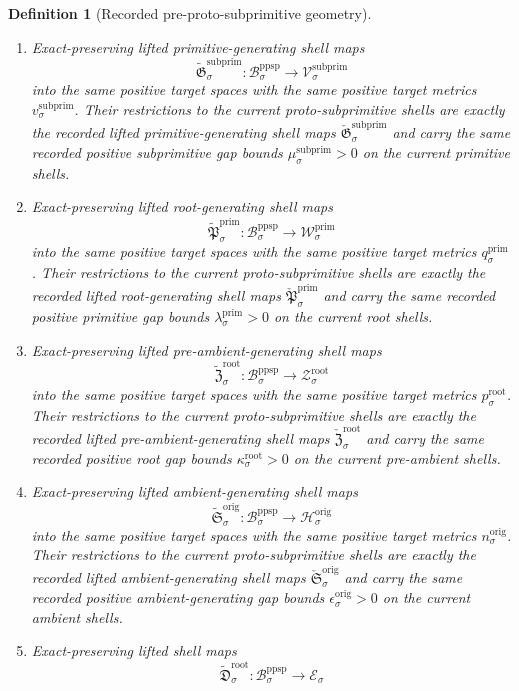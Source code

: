 \documentclass[11pt]{article}
\newcommand{\ShellTarget}[1]{\mathcal E_{#1}}
\newcommand{\OriginTarget}[1]{\mathcal H_{#1}^{\mathrm{orig}}}
\newcommand{\OriginTargetMetric}[1]{n_{#1}^{\mathrm{orig}}}
\newcommand{\OriginGap}[1]{\epsilon_{#1}^{\mathrm{orig}}}
\newcommand{\RootTarget}[1]{\mathcal Z_{#1}^{\mathrm{root}}}
\newcommand{\RootTargetMetric}[1]{p_{#1}^{\mathrm{root}}}
\newcommand{\RootGap}[1]{\kappa_{#1}^{\mathrm{root}}}
\newcommand{\PrimTarget}[1]{\mathcal W_{#1}^{\mathrm{prim}}}
\newcommand{\PrimTargetMetric}[1]{q_{#1}^{\mathrm{prim}}}
\newcommand{\PrimGap}[1]{\lambda_{#1}^{\mathrm{prim}}}
\newcommand{\SubprimTarget}[1]{\mathcal V_{#1}^{\mathrm{subprim}}}
\newcommand{\SubprimTargetMetric}[1]{v_{#1}^{\mathrm{subprim}}}
\newcommand{\SubprimGap}[1]{\mu_{#1}^{\mathrm{subprim}}}
\newcommand{\ProtoSubprimLiftedPrimitive}[1]{\check{\mathfrak G}_{#1}^{\mathrm{subprim}}}
\newcommand{\ProtoSubprimLiftedRoot}[1]{\check{\mathfrak P}_{#1}^{\mathrm{prim}}}
\newcommand{\ProtoSubprimLiftedPreAmbient}[1]{\check{\mathfrak Z}_{#1}^{\mathrm{root}}}
\newcommand{\ProtoSubprimLiftedAmbient}[1]{\check{\mathfrak S}_{#1}^{\mathrm{orig}}}
\newcommand{\PreProtoSubprimSpace}[1]{\mathcal B_{#1}^{\mathrm{ppsp}}}
\newcommand{\PreProtoSubprimLiftedPrimitive}[1]{\widetilde{\mathfrak G}_{#1}^{\mathrm{subprim}}}
\newcommand{\PreProtoSubprimLiftedRoot}[1]{\widetilde{\mathfrak P}_{#1}^{\mathrm{prim}}}
\newcommand{\PreProtoSubprimLiftedPreAmbient}[1]{\widetilde{\mathfrak Z}_{#1}^{\mathrm{root}}}
\newcommand{\PreProtoSubprimLiftedAmbient}[1]{\widetilde{\mathfrak S}_{#1}^{\mathrm{orig}}}
\newcommand{\PreProtoSubprimLiftedShell}[1]{\widetilde{\mathfrak D}_{#1}^{\mathrm{root}}}
\newtheorem{definition}{Definition}
\begin{document}
\begin{definition}[Recorded pre-proto-subprimitive geometry]
\begin{enumerate}
    \item Exact-preserving lifted primitive-generating shell maps
    \[
    \PreProtoSubprimLiftedPrimitive{\sigma}:\PreProtoSubprimSpace{\sigma}\to\SubprimTarget{\sigma}
    \]
    into the same positive target spaces with the same positive target metrics \(\SubprimTargetMetric{\sigma}\). Their restrictions to the current proto-subprimitive shells are exactly the recorded lifted primitive-generating shell maps \(\ProtoSubprimLiftedPrimitive{\sigma}\) and carry the same recorded positive subprimitive gap bounds \(\SubprimGap{\sigma}>0\) on the current primitive shells.
    \item Exact-preserving lifted root-generating shell maps
    \[
    \PreProtoSubprimLiftedRoot{\sigma}:\PreProtoSubprimSpace{\sigma}\to\PrimTarget{\sigma}
    \]
    into the same positive target spaces with the same positive target metrics \(\PrimTargetMetric{\sigma}\). Their restrictions to the current proto-subprimitive shells are exactly the recorded lifted root-generating shell maps \(\ProtoSubprimLiftedRoot{\sigma}\) and carry the same recorded positive primitive gap bounds \(\PrimGap{\sigma}>0\) on the current root shells.
    \item Exact-preserving lifted pre-ambient-generating shell maps
    \[
    \PreProtoSubprimLiftedPreAmbient{\sigma}:\PreProtoSubprimSpace{\sigma}\to\RootTarget{\sigma}
    \]
    into the same positive target spaces with the same positive target metrics \(\RootTargetMetric{\sigma}\). Their restrictions to the current proto-subprimitive shells are exactly the recorded lifted pre-ambient-generating shell maps \(\ProtoSubprimLiftedPreAmbient{\sigma}\) and carry the same recorded positive root gap bounds \(\RootGap{\sigma}>0\) on the current pre-ambient shells.
    \item Exact-preserving lifted ambient-generating shell maps
    \[
    \PreProtoSubprimLiftedAmbient{\sigma}:\PreProtoSubprimSpace{\sigma}\to\OriginTarget{\sigma}
    \]
    into the same positive target spaces with the same positive target metrics \(\OriginTargetMetric{\sigma}\). Their restrictions to the current proto-subprimitive shells are exactly the recorded lifted ambient-generating shell maps \(\ProtoSubprimLiftedAmbient{\sigma}\) and carry the same recorded positive ambient-generating gap bounds \(\OriginGap{\sigma}>0\) on the current ambient shells.
    \item Exact-preserving lifted shell maps
    \[
    \PreProtoSubprimLiftedShell{\sigma}:\PreProtoSubprimSpace{\sigma}\to\ShellTarget{\sigma}
\]
\end{enumerate}
\end{definition}
\end{document}
